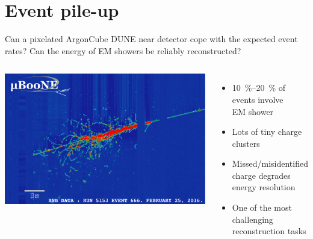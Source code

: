\documentclass[]{beamer}
\newcommand*{\emphcoltitle}{blue}
\newcommand*{\AC}{{ArgonCube}}
\newcommand*{\dune}{{DUNE}}
\begin{document}
\section{Event pile-up}

\begin{frame}{Can a pixelated \AC{} \dune{} near detector cope with the expected event rates?}{\color{\emphcoltitle} Can the energy of \Pgpz EM showers be reliably reconstructed?}
	\begin{columns}[c]
		\centering
		\includegraphics[width=\textwidth]{defence/uboone_em-shower}
		\begin{itemize}
			\item \SIrange{10}{20}{\percent} of events involve\\
				\HepProcess{\Pgpz \to \Pgg\Pgg} \textrightarrow{} EM shower
			\item Lots of tiny charge clusters
			\item Missed/misidentified charge degrades energy resolution
			\item One of the most challenging reconstruction tasks
		\end{itemize}
	\end{columns}
\end{frame}
\end{document}

